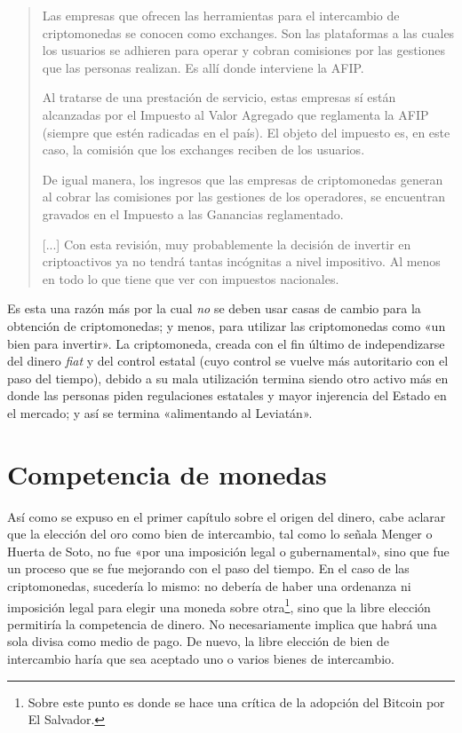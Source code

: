 \documentclass[12pt,a4paper,twoside]{book}
\begin{document}
\begin{quotation}
Las empresas que ofrecen las herramientas para el intercambio de criptomonedas se conocen como exchanges. Son las plataformas a las cuales los usuarios se adhieren para operar y cobran comisiones por las gestiones que las personas realizan. Es allí donde interviene la AFIP.

Al tratarse de una prestación de servicio, estas empresas sí están alcanzadas por el Impuesto al Valor Agregado que reglamenta la AFIP (siempre que estén radicadas en el país). El objeto del impuesto es, en este caso, la comisión que los exchanges reciben de los usuarios.

De igual manera, los ingresos que las empresas de criptomonedas generan al cobrar las comisiones por las gestiones de los operadores, se encuentran gravados en el Impuesto a las Ganancias reglamentado.

[...] Con esta revisión, muy probablemente la decisión de invertir en criptoactivos ya no tendrá tantas incógnitas a nivel impositivo. Al menos en todo lo que tiene que ver con impuestos nacionales. \cite{bitcoin:impuestos}
\end{quotation}

Es esta una razón más por la cual \textit{no} se deben usar casas de cambio para la obtención de criptomonedas; y menos, para utilizar las criptomonedas como «un bien para invertir». La criptomoneda, creada con el fin último de independizarse del dinero \textit{fiat} y del control estatal (cuyo control se vuelve más autoritario con el paso del tiempo), debido a su mala utilización termina siendo otro activo más en donde las personas piden regulaciones estatales y mayor injerencia del Estado en el mercado; y así se termina «alimentando al Leviatán».

\section{Competencia de monedas}
Así como se expuso en el primer capítulo sobre el origen del dinero, cabe aclarar que la elección del oro como bien de intercambio, tal como lo señala Menger o Huerta de Soto, no fue «por una imposición legal o gubernamental», sino que fue un proceso que se fue mejorando con el paso del tiempo. En el caso de las criptomonedas, sucedería lo mismo: no debería de haber una ordenanza ni imposición legal para elegir una moneda sobre otra\footnote{Sobre este punto es donde se hace una crítica de la adopción del Bitcoin por El Salvador.}, sino que la libre elección permitiría la competencia de dinero. No necesariamente implica que habrá una sola divisa como medio de pago. De nuevo, la libre elección de bien de intercambio haría que sea aceptado uno o varios bienes de intercambio.
\end{document}
